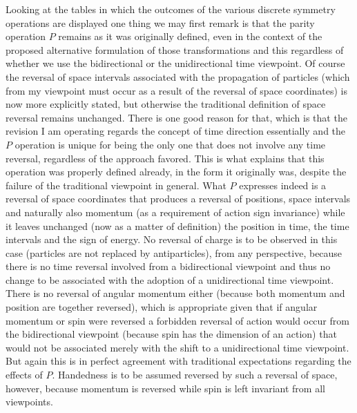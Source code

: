 \documentclass[notitlepage,12pt]{report}
\begin{document}
Looking at the tables in which the outcomes of the various discrete symmetry operations are displayed one thing we may first remark is that the parity operation $P$ remains as it was originally defined, even in the context of the proposed alternative formulation of those transformations and this regardless of whether we use the bidirectional or the unidirectional time viewpoint. Of course the reversal of space intervals associated with the propagation of particles (which from my viewpoint must occur as a result of the reversal of space coordinates) is now more explicitly stated, but otherwise the traditional definition of space reversal remains unchanged. There is one good reason for that, which is that the revision I am operating regards the concept of time direction essentially and the $P$ operation is unique for being the only one that does not involve any time reversal, regardless of the approach favored. This is what explains that this operation was properly defined already, in the form it originally was, despite the failure of the traditional viewpoint in general. What $P$ expresses indeed is a reversal of space coordinates that produces a reversal of positions, space intervals and naturally also momentum (as a requirement of action sign invariance) while it leaves unchanged (now as a matter of definition) the position in time, the time intervals and the sign of energy. No reversal of charge is to be observed in this case (particles are not replaced by antiparticles), from any perspective, because there is no time reversal involved from a bidirectional viewpoint and thus no change to be associated with the adoption of a unidirectional time viewpoint. There is no reversal of angular momentum either (because both momentum and position are together reversed), which is appropriate given that if angular momentum or spin were reversed a forbidden reversal of action would occur from the bidirectional viewpoint (because spin has the dimension of an action) that would not be associated merely with the shift to a unidirectional time viewpoint. But again this is in perfect agreement with traditional expectations regarding the effects of $P$. Handedness is to be assumed reversed by such a reversal of space, however, because momentum is reversed while spin is left invariant from all viewpoints.
\end{document}
